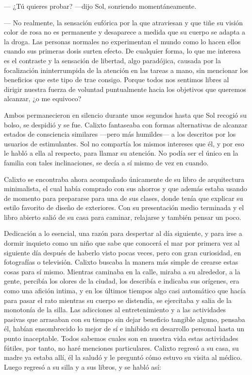 \documentclass[12pt]{article}
\begin{document}
	--- ¿Tú quieres probar? ---dijo Sol, sonriendo momentáneamente.

	--- No realmente, la sensación eufórica por la que atraviesan y que
	tiñe su visión color de rosa no es permanente y desaparece a medida que
	su cuerpo se adapta a la droga. Las personas normales no experimentan el
	mundo como lo hacen ellos cuando sus primeras dosis surten efecto. De
	cualquier forma, lo que me interesa es el contraste y la sensación de
	libertad, algo paradójica, causada por la focalización ininterrumpida de
	la atención en las tareas a mano, sin mencionar los beneficios que este
	tipo de  trae consigo. Porque todos nos sentimos
	libres al dirigir nuestra fuerza de voluntad puntualmente hacia los
	objetivos que queremos alcanzar, ¿o me equivoco?

	Ambos permanecieron en silencio durante unos segundos hasta que Sol
	recogió su bolso, se despidió y se fue. Calixto fantaseaba con formas
	alternativas de alcanzar estados de consciencia similares ---pero más
	humildes--- a los descritos por los usuarios de estimulantes. Sol no
	compartía los mismos intereses que él, y por eso le habló a ella al
	respecto, para llamar su atención. No podía ser el único en la familia
	con tales inclinaciones, se decía a sí mismo de vez en cuando.

	Calixto se encontraba ahora acompañado únicamente de su libro de
	arquitectura minimalista, el cual había comprado con sus ahorros y que
	además estaba usando de momento para prepararse para una de sus
	clases, donde tenía que explicar su estilo favorito de diseño de
	exteriores. Con su presentación medio terminada y el libro abierto
	salió de su casa para caminar, relajarse y también pensar un poco.

	Dedicación a lo esencial, una razón para despertar al día siguiente, y
	para irse a dormir inquieto como un niño que sabe que conocerá el mar
	por primera vez al siguiente día después de haberlo visto pocas veces,
	pero con gran curiosidad, en fotografías o televisión. Calixto buscaba
	la manera más simple de crearse estas cosas para sí mismo. Mientras
	caminaba en la calle, miraba a su alrededor, a la gente, percibía los
	olores de la ciudad, los describía e indicaba sus orígenes, era como una
	afición intima, y en los últimos tiempos algo casi automático que hacía
	para pasar el rato mientras su cuerpo se distendía, se ejercitaba y
	salia de la monotonía de la silla. Las adicciones al entretenimiento
	y a las actividades pasivas que arrasaban con su tiempo sin dejar
	beneficio tangible alguno, pensaba él, habían ensombrecido lo mejor
	de sí e inhibido su desarrollo personal hasta un punto inaceptable.
	Todos sabemos cuales son en nuestra vida estas actividades fútiles,
	por tanto, no haré menciones particulares. Calixto regresó a su casa,
	su madre ya estaba allí, él la saludó y le preguntó cómo estuvo su
	visita al médico. Luego regresó a su silla y a sus libros, y se habló
	así:
\end{document}
